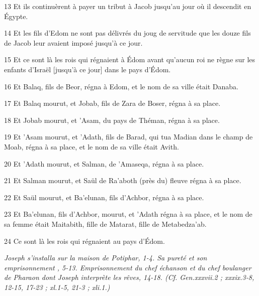 \par 13 Et ils continuèrent à payer un tribut à Jacob jusqu'au jour où il descendit en Égypte.
\par 14 Et les fils d'Edom ne sont pas délivrés du joug de servitude que les douze fils de Jacob leur avaient imposé jusqu'à ce jour.
\par 15 Et ce sont là les rois qui régnaient à Édom avant qu'aucun roi ne règne sur les enfants d'Israël [jusqu'à ce jour] dans le pays d'Édom.
\par 16 Et Balaq, fils de Beor, régna à Edom, et le nom de sa ville était Danaba.
\par 17 Et Balaq mourut, et Jobab, fils de Zara de Boser, régna à sa place.
\par 18 Et Jobab mourut, et 'Asam, du pays de Théman, régna à sa place.
\par 19 Et 'Asam mourut, et 'Adath, fils de Barad, qui tua Madian dans le champ de Moab, régna à sa place, et le nom de sa ville était Avith.
\par 20 Et 'Adath mourut, et Salman, de 'Amaseqa, régna à sa place.
\par 21 Et Salman mourut, et Saül de Ra'aboth (près du) fleuve régna à sa place.
\par 22 Et Saül mourut, et Ba'elunan, fils d'Achbor, régna à sa place.
\par 23 Et Ba'elunan, fils d'Achbor, mourut, et 'Adath régna à sa place, et le nom de sa femme était Maitabith, fille de Matarat, fille de Metabedza'ab.
\par 24 Ce sont là les rois qui régnaient au pays d'Édom.


\par \textit{Joseph s'installa sur la maison de Potiphar, 1-4. Sa pureté et son emprisonnement , 5-13. Emprisonnement du chef échanson et du chef boulanger de Pharaon dont Joseph interprète les rêves, 14-18. (Cf. Gen.xxxvii.2 ; xxxix.3-8, 12-15, 17-23 ; xl.1-5, 21-3 ; xli.1.)}

